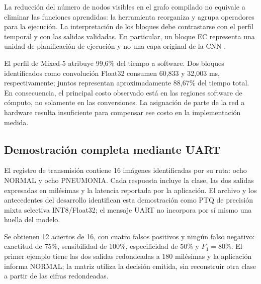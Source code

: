 La reducción del número de nodos visibles en el grafo compilado no equivale a eliminar las funciones aprendidas: la herramienta reorganiza y agrupa operadores para la ejecución. La interpretación de los bloques debe contrastarse con el perfil temporal y con las salidas validadas. En particular, un bloque EC representa una unidad de planificación de ejecución y no una capa original de la CNN \cite{cap4_stcompiler}.


El perfil de Mixed-5 atribuye 99,6\% del tiempo a software. Dos bloques identificados como convolución Float32 consumen 60,833 y 32,003 ms, respectivamente; juntos representan aproximadamente 88,67\% del tiempo total. En consecuencia, el principal costo observado está en las regiones software de cómputo, no solamente en las conversiones. La asignación de parte de la red a hardware resulta insuficiente para compensar ese costo en la implementación medida.

\FloatBarrier
\subsection{Demostración completa mediante UART}
El registro de transmisión contiene 16 imágenes identificadas por su ruta: ocho NORMAL y ocho PNEUMONIA. Cada respuesta incluye la clase, las dos salidas expresadas en milésimas y la latencia reportada por la aplicación. El archivo y los antecedentes del desarrollo identifican esta demostración como PTQ de precisión mixta selectiva INT8/Float32; el mensaje UART no incorpora por sí mismo una huella del modelo.

Se obtienen 12 aciertos de 16, con cuatro falsos positivos y ningún falso negativo: exactitud de 75\%, sensibilidad de 100\%, especificidad de 50\% y $F_1=80$\%. El primer ejemplo tiene las dos salidas redondeadas a 180 milésimas y la aplicación informa NORMAL; la matriz utiliza la decisión emitida, sin reconstruir otra clase a partir de las cifras redondeadas.

